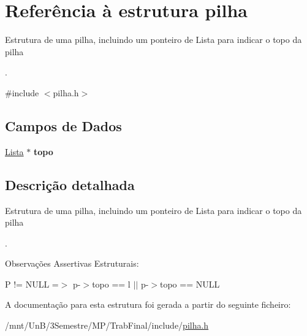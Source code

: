 \hypertarget{structpilha}{\section{Referência à estrutura pilha}
\label{structpilha}
}


Estrutura de uma pilha, incluindo um ponteiro de Lista para indicar o topo da pilha \par
.  




{\ttfamily \#include $<$pilha.\-h$>$}

\subsection*{Campos de Dados}
\begin{DoxyCompactItemize}
\item 
\hypertarget{structpilha_aa759a9e57d1be8b4d84f106605f44fbc_aa759a9e57d1be8b4d84f106605f44fbc}{\hyperlink{pilha_8h_ab845f95877fc6e5b120d2f0186d78d54_ab845f95877fc6e5b120d2f0186d78d54}{Lista} $\ast$ {\bfseries topo}}\label{structpilha_aa759a9e57d1be8b4d84f106605f44fbc_aa759a9e57d1be8b4d84f106605f44fbc}

\end{DoxyCompactItemize}


\subsection{Descrição detalhada}
Estrutura de uma pilha, incluindo um ponteiro de Lista para indicar o topo da pilha \par
. 

\begin{DoxyRemark}{Observações}
Assertivas Estruturais\-:
\begin{DoxyItemize}
\item P != N\-U\-L\-L =$>$ p-\/$>$topo == l $\vert$$\vert$ p-\/$>$topo == N\-U\-L\-L 
\end{DoxyItemize}
\end{DoxyRemark}


A documentação para esta estrutura foi gerada a partir do seguinte ficheiro\-:\begin{DoxyCompactItemize}
\item 
/mnt/\-Un\-B/3\-Semestre/\-M\-P/\-Trab\-Final/include/\hyperlink{pilha_8h}{pilha.\-h}\end{DoxyCompactItemize}
